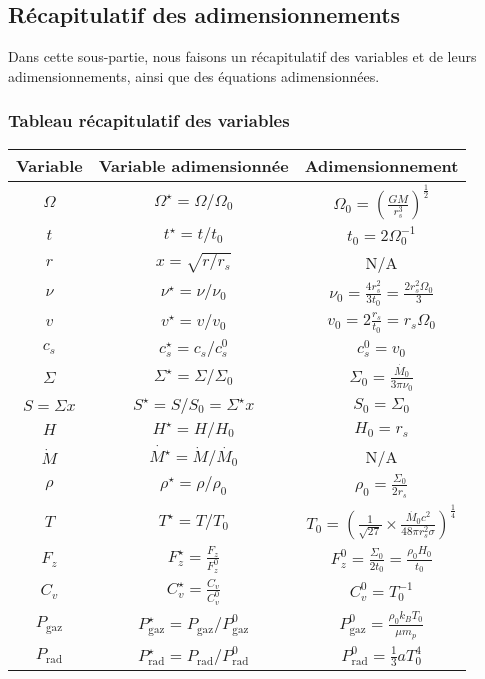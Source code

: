 \subsection{Récapitulatif des adimensionnements}

Dans cette sous-partie, nous faisons un récapitulatif des variables et de leurs
adimensionnements, ainsi que des équations adimensionnées.

\subsubsection{Tableau récapitulatif des variables}

\begin{center}
    \begin{tabular}{|c|c|c|}
        \hline
        Variable & Variable adimensionnée & Adimensionnement \\
        \hline
        $\Omega$ & $\Omega^\star = \Omega/\Omega_0$ & $\Omega_0 = \left( \frac{G M}{r^3_s} \right)^\frac{1}{2}$ \\
        $t$ & $t^\star = t/t_0$ & $t_0 = 2 \Omega_0^{-1}$ \\
        $r$ & $x = \sqrt{r/r_s}$ & N/A \\
        $\nu$ & $\nu^\star = \nu/\nu_0$ & $\nu_0 = \frac{4 r_s^2}{3 t_0} = \frac{2 r_s^2 \Omega_0}{3}$ \\
        $v$ & $v^\star = v/v_0$ & $v_0 = 2 \frac{r_s}{t_0} = r_s \Omega_0$ \\
        $c_s$ & $c_s^\star = c_s/c_s^0$ & $c_s^0 = v_0$ \\
        $\Sigma$ & $\Sigma^\star = \Sigma/\Sigma_0$ & $\Sigma_0 = \frac{\dot{M_0}}{3 \pi \nu_0}$ \\
        $S = \Sigma x$ & $S^\star = S/S_0 = \Sigma^\star x$ & $S_0 = \Sigma_0$ \\
        $H$ & $H^\star = H/H_0$ & $H_0 = r_s$ \\
        $\dot{M}$ & $\dot{M^\star} = \dot{M}/\dot{M_0}$ & N/A \\
        $\rho$ & $\rho^\star = \rho/\rho_0$ & $\rho_0 = \frac{\Sigma_0}{2 r_s}$ \\
        $T$ & $T^\star = T/T_0$ & $T_0 = \left(\frac{1}{\sqrt{27}} \times \frac{\dot{M_0} c^2}{48 \pi r_s^2 \sigma} \right)^\frac{1}{4}$ \\
        $F_z$ & $F_z^\star = \frac{F_z}{F_z^0}$ & $F_z^0 = \frac{\Sigma_0}{2 t_0} = \frac{\rho_0 H_0}{t_0}$ \\
        $C_v$ & $C_v^\star = \frac{C_v}{C_v^0}$ & $C_v^0 = T_0^{-1}$ \\
        $P_\mathrm{gaz}$ & $P_\mathrm{gaz}^\star = P_\mathrm{gaz}/P_\mathrm{gaz}^0$ & $P_\mathrm{gaz}^0 = \frac{\rho_0 k_B T_0}{\mu m_p}$ \\
        $P_\mathrm{rad}$ & $P_\mathrm{rad}^\star = P_\mathrm{rad}/P_\mathrm{rad}^0$ & $P_\mathrm{rad}^0 = \frac{1}{3} a T_0^4$ \\
        \hline
    \end{tabular}
\end{center}

